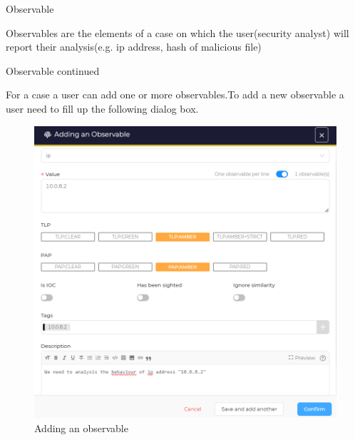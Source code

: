 \begin{frame}{Observable}
\begin{justify}
Observables are the elements of a case on which the user(security analyst) will report their analysis(e.g. ip address, hash of malicious file)

\end{justify}

\end{frame}


\begin{frame}{Observable continued}
\begin{justify}

For a case a user can add one or more observables.To add a new observable a user need to fill up the following dialog box.
\begin{figure}[htp]
    \centering
    \includegraphics[scale = 0.28]{Adding a observable.png}
    \caption{Adding an observable}
    \label{Adding an observable}
\end{figure}


\end{justify}
    
\end{frame}


